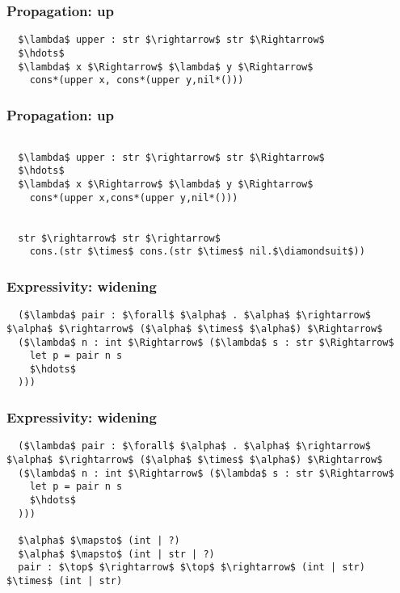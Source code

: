 \documentclass{beamer}
\begin{document}
\begin{frame}[fragile]
  \frametitle{Propagation: up}

  \begin{lstlisting}
  $\lambda$ upper : str $\rightarrow$ str $\Rightarrow$
  $\hdots$
  $\lambda$ x $\Rightarrow$ $\lambda$ y $\Rightarrow$
    cons*(upper x, cons*(upper y,nil*()))
  \end{lstlisting}

\end{frame}

\begin{frame}[fragile]
  \frametitle{Propagation: up}

  \begin{lstlisting}

  $\lambda$ upper : str $\rightarrow$ str $\Rightarrow$
  $\hdots$
  $\lambda$ x $\Rightarrow$ $\lambda$ y $\Rightarrow$
    cons*(upper x,cons*(upper y,nil*()))


  str $\rightarrow$ str $\rightarrow$
    cons.(str $\times$ cons.(str $\times$ nil.$\diamondsuit$))
  \end{lstlisting}

\end{frame}

\begin{frame}[fragile]
  \frametitle{Expressivity: widening}

  \begin{lstlisting}
  ($\lambda$ pair : $\forall$ $\alpha$ . $\alpha$ $\rightarrow$ $\alpha$ $\rightarrow$ ($\alpha$ $\times$ $\alpha$) $\Rightarrow$ 
  ($\lambda$ n : int $\Rightarrow$ ($\lambda$ s : str $\Rightarrow$ 
    let p = pair n s
    $\hdots$
  )))

  \end{lstlisting}
\end{frame}


\begin{frame}[fragile]
  \frametitle{Expressivity: widening}

  \begin{lstlisting}
  ($\lambda$ pair : $\forall$ $\alpha$ . $\alpha$ $\rightarrow$ $\alpha$ $\rightarrow$ ($\alpha$ $\times$ $\alpha$) $\Rightarrow$ 
  ($\lambda$ n : int $\Rightarrow$ ($\lambda$ s : str $\Rightarrow$ 
    let p = pair n s
    $\hdots$
  )))

  $\alpha$ $\mapsto$ (int | ?) 
  $\alpha$ $\mapsto$ (int | str | ?)
  pair : $\top$ $\rightarrow$ $\top$ $\rightarrow$ (int | str) $\times$ (int | str)

  \end{lstlisting}
\end{frame}
\end{document}
